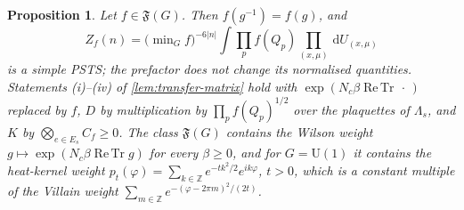 \documentclass[11pt,a4paper]{amsart}
\newtheorem{proposition}[theorem]{Proposition}
\theoremstyle{definition}
\theoremstyle{remark}
\numberwithin{equation}{section}
\DeclareMathOperator{\ReTr}{Re\,Tr}  %
\newcommand{\Z}{\mathbb{Z}}          %
\newcommand{\Fclass}{\mathfrak{F}}   %
\newcommand{\dd}{\,\mathrm{d}}             %
\newcommand{\U}{\mathrm{U}}                %
\newcommand{\PSTS}{\textup{PSTS}}          %
\begin{document}
\begin{proposition}\label{prop:class-weight-psts}
Let $f\in\Fclass(G)$. Then $f(g^{-1})=f(g)$, and
\[
Z_f(n)=\bigl(\min\nolimits_Gf\bigr)^{-6|n|}\int\prod_pf(Q_p)\prod_{(x,\mu)}\dd U_{(x,\mu)}
\]
is a simple \PSTS{}; the prefactor does not change its normalised quantities. Statements (i)--(iv) of \cref{lem:transfer-matrix} hold with $\exp(N_c\beta\ReTr\,\cdot\,)$ replaced by $f$, $D$ by multiplication by $\prod_pf(Q_p)^{1/2}$ over the plaquettes of $\Lambda_s$, and $K$ by $\bigotimes_{e\in E_s}C_f\ge0$. The class $\Fclass(G)$ contains the Wilson weight $g\mapsto\exp(N_c\beta\ReTr g)$ for every $\beta\ge0$, and for $G=\U(1)$ it contains the heat-kernel weight $p_t(\varphi)=\sum_{k\in\Z}e^{-tk^2/2}e^{ik\varphi}$, $t>0$, which is a constant multiple of the Villain weight $\sum_{m\in\Z}e^{-(\varphi-2\pi m)^2/(2t)}$.
\end{proposition}
\end{document}
